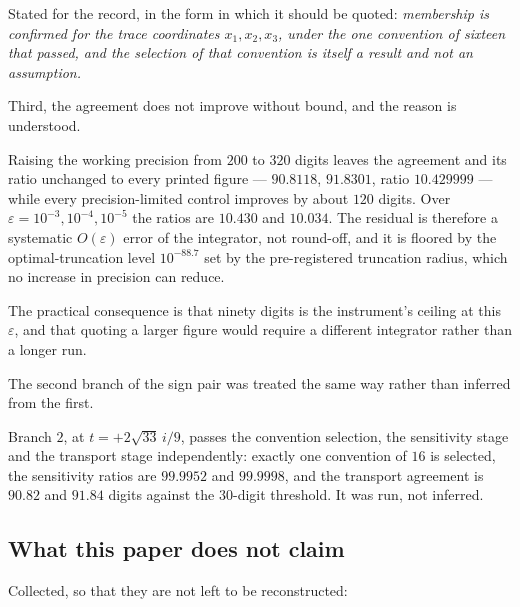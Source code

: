 Stated for the record, in the form in which it should be quoted:
\emph{membership is confirmed for the trace coordinates $x_1,x_2,x_3$, under
the one convention of sixteen that passed, and the selection of that convention
is itself a result and not an assumption.}

Third, the agreement does not improve without bound, and the reason is
understood.

\begin{remark}
Raising the working precision from $200$ to $320$ digits leaves the agreement
and its ratio unchanged to every printed figure --- $90.8118$, $91.8301$, ratio
$10.429999$ --- while every precision-limited control improves by about $120$
digits. Over $\varepsilon=10^{-3},10^{-4},10^{-5}$ the ratios are $10.430$ and
$10.034$. The residual is therefore a systematic $O(\varepsilon)$ error of the
integrator, not round-off, and it is floored by the optimal-truncation level
$10^{-88.7}$ set by the pre-registered truncation radius, which no increase in
precision can reduce.
\end{remark}

The practical consequence is that ninety digits is the instrument's ceiling at
this $\varepsilon$, and that quoting a larger figure would require a different
integrator rather than a longer run.

The second branch of the sign pair was treated the same way rather than
inferred from the first.

\begin{remark}
Branch $2$, at $t=+2\sqrt{33}\,i/9$, passes the convention selection, the
sensitivity stage and the transport stage independently: exactly one convention
of $16$ is selected, the sensitivity ratios are $99.9952$ and $99.9998$, and
the transport agreement is $90.82$ and $91.84$ digits against the $30$-digit
threshold. It was run, not inferred.
\end{remark}

\subsection{What this paper does not claim}\label{ssec:not-claimed}

Collected, so that they are not left to be reconstructed:

